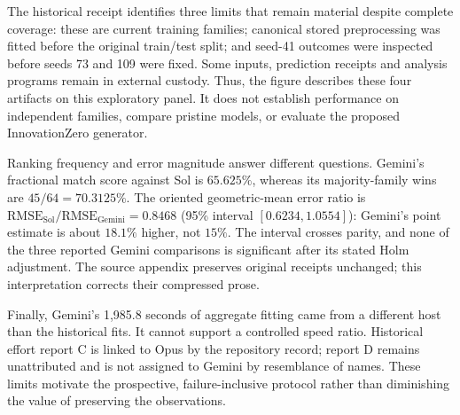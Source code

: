 The historical receipt identifies three limits that remain material despite complete coverage: these are current training families; canonical stored preprocessing was fitted before the original train/test split; and seed-41 outcomes were inspected before seeds 73 and 109 were fixed. Some inputs, prediction receipts and analysis programs remain in external custody. Thus, the figure describes these four artifacts on this exploratory panel. It does not establish performance on independent families, compare pristine models, or evaluate the proposed InnovationZero generator.

Ranking frequency and error magnitude answer different questions. Gemini's fractional match score against Sol is $65.625\%$, whereas its majority-family wins are $45/64=70.3125\%$. The oriented geometric-mean error ratio is $\mathrm{RMSE}_{\mathrm{Sol}}/\mathrm{RMSE}_{\mathrm{Gemini}}=0.8468$ (95\% interval $[0.6234,1.0554]$): Gemini's point estimate is about $18.1\%$ higher, not $15\%$. The interval crosses parity, and none of the three reported Gemini comparisons is significant after its stated Holm adjustment. The source appendix preserves original receipts unchanged; this interpretation corrects their compressed prose.

Finally, Gemini's 1,985.8 seconds of aggregate fitting came from a different host than the historical fits. It cannot support a controlled speed ratio. Historical effort report C is linked to Opus by the repository record; report D remains unattributed and is not assigned to Gemini by resemblance of names. These limits motivate the prospective, failure-inclusive protocol rather than diminishing the value of preserving the observations.
